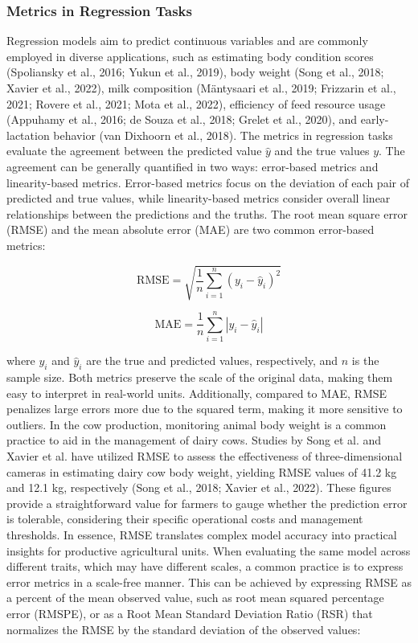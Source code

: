 \subsubsection{Metrics in Regression Tasks}

Regression models aim to predict continuous variables and are commonly employed in diverse applications, such as estimating body condition scores (Spoliansky et al., 2016; Yukun et al., 2019), body weight (Song et al., 2018; Xavier et al., 2022), milk composition (Mäntysaari et al., 2019; Frizzarin et al., 2021; Rovere et al., 2021; Mota et al., 2022), efficiency of feed resource usage (Appuhamy et al., 2016; de Souza et al., 2018; Grelet et al., 2020), and early-lactation behavior (van Dixhoorn et al., 2018). The metrics in regression tasks evaluate the agreement between the predicted value $\hat{y}$ and the true values $y$. The agreement can be generally quantified in two ways: error-based metrics and linearity-based metrics. Error-based metrics focus on the deviation of each pair of predicted and true values, while linearity-based metrics consider overall linear relationships between the predictions and the truths. The root mean square error (RMSE) and the mean absolute error (MAE) are two common error-based metrics:

\begin{equation} \label{eq_rmse}
\text{RMSE} = \sqrt{\frac{1}{n} \sum_{i=1}^{n} (y_i - \hat{y}_i)^2}
\end{equation}

\begin{equation} \label{eq_mae}
    \text{MAE} = \frac{1}{n} \sum_{i=1}^{n} |y_i - \hat{y}_i|
\end{equation}

where $y_i$ and $\hat{y}_i$ are the true and predicted values, respectively, and $n$ is the sample size. Both metrics preserve the scale of the original data, making them easy to interpret in real-world units. Additionally, compared to MAE, RMSE penalizes large errors more due to the squared term, making it more sensitive to outliers. In the cow production, monitoring animal body weight is a common practice to aid in the management of dairy cows. Studies by Song et al. and Xavier et al. have utilized RMSE to assess the effectiveness of three-dimensional cameras in estimating dairy cow body weight, yielding RMSE values of 41.2 kg and 12.1 kg, respectively (Song et al., 2018; Xavier et al., 2022). These figures provide a straightforward value for farmers to gauge whether the prediction error is tolerable, considering their specific operational costs and management thresholds. In essence, RMSE translates complex model accuracy into practical insights for productive agricultural units.
When evaluating the same model across different traits, which may have different scales, a common practice is to express error metrics in a scale-free manner. This can be achieved by expressing RMSE as a percent of the mean observed value, such as root mean squared percentage error (RMSPE), or as a Root Mean Standard Deviation Ratio (RSR) that normalizes the RMSE by the standard deviation of the observed values:

